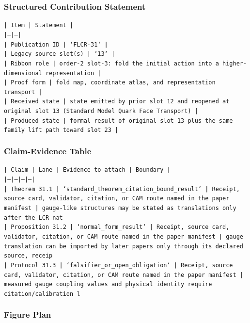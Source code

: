 \documentclass[11pt]{article}
\begin{document}
\subsubsection*{Structured Contribution Statement}

\noindent\texttt{| Item | Statement |}\\
\noindent\texttt{|---|---|}\\
\noindent\texttt{| Publication ID | `FLCR-31` |}\\
\noindent\texttt{| Legacy source slot(s) | `13` |}\\
\noindent\texttt{| Ribbon role | order-2 slot-3: fold the initial action into a higher-dimensional representation |}\\
\noindent\texttt{| Proof form | fold map, coordinate atlas, and representation transport |}\\
\noindent\texttt{| Received state | state emitted by prior slot 12 and reopened at original slot 13 (Standard Model Quark Face Transport) |}\\
\noindent\texttt{| Produced state | formal result of original slot 13 plus the same-family lift path toward slot 23 |}\\

\subsubsection*{Claim-Evidence Table}

\noindent\texttt{| Claim | Lane | Evidence to attach | Boundary |}\\
\noindent\texttt{|---|---|---|---|}\\
\noindent\texttt{| Theorem 31.1 | `standard\_theorem\_citation\_bound\_result` | Receipt, source card, validator, citation, or CAM route named in the paper manifest | gauge-like structures may be stated as translations only after the LCR-nat}\\
\noindent\texttt{| Proposition 31.2 | `normal\_form\_result` | Receipt, source card, validator, citation, or CAM route named in the paper manifest | gauge translation can be imported by later papers only through its declared source, receip}\\
\noindent\texttt{| Protocol 31.3 | `falsifier\_or\_open\_obligation` | Receipt, source card, validator, citation, or CAM route named in the paper manifest | measured gauge coupling values and physical identity require citation/calibration l}\\

\subsubsection*{Figure Plan}
\end{document}
